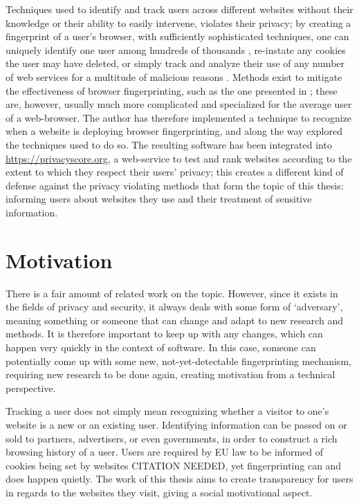 \documentclass[
    fontsize=12pt,
    headings=small,
    parskip=half,
    bibliography=totoc,
    numbers=noenddot,
    open=any
    ]{scrreprt}
\begin{document}
Techniques used to identify and track users across different websites without
their knowledge or their ability to easily intervene, violates their privacy; by creating a fingerprint
of a user's browser, with sufficiently sophisticated techniques, one can uniquely identify one user
among hundreds of thousands \cite{am_i_unique}, re-instate any cookies the user may have deleted,
or simply track and analyze their use of any number of web services for a multitude of malicious reasons \cite{eckersley2010unique}.
Methods exist to mitigate the effectiveness of browser fingerprinting, such as the one presented
in \cite{laperdrix2015mitigating};
these are, however, usually much more complicated and specialized for the average user of a web-browser.
The author has therefore implemented a technique to recognize when a website is deploying browser fingerprinting,
and along the way explored the techniques used to do so. The resulting software has been integrated into
\url{https://privacyscore.org}, a web-service to test and rank websites according to the extent to which they
respect their users' privacy; this creates a different kind of defense against the privacy violating
methods that form the topic of this thesis: informing users about websites they use and their treatment of
sensitive information.

\section{Motivation}
There is a fair amount of related work on the topic. However, since it exists in the fields of privacy and security,
it always deals with some form of `adversary', meaning something or someone that can change and adapt to new
research and methods. It is therefore important to keep up with any changes, which can happen very quickly
in the context of software.
In this case, someone can potentially come up with some new, not-yet-detectable fingerprinting mechanism,
requiring new research to be done again, creating motivation from a technical perspective.

Tracking a user does not simply mean recognizing whether a visitor to one's website is a new or an existing user.
Identifying information can be passed on or sold to partners, advertisers, or even governments, in order to
construct a rich browsing history of a user. Users are required by EU law to be informed of cookies being set
by websites CITATION NEEDED, yet fingerprinting can and does happen quietly.
The work of this thesis aims to create transparency for users in regards to
the websites they visit, giving a social motivational aspect.
\end{document}
